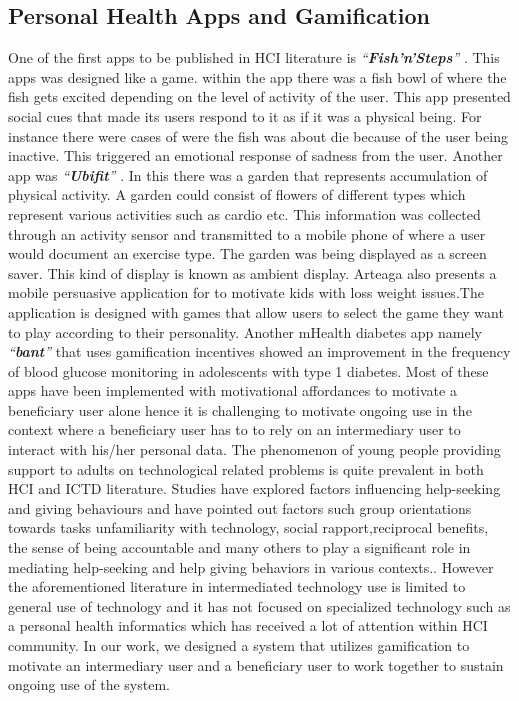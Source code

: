 \documentclass{sig-alternate}
\begin{document}
\subsection{Personal Health Apps and Gamification}  
One of the first apps to be published in HCI literature is \emph{``\textbf{Fish'n'Steps}''} \cite{lin2006:fish}. This apps was designed like a game. within the app there  was a fish bowl of where the fish gets excited depending on the level of activity of the user. This app presented social cues that made its users respond to it as if it was a physical being. For instance there were cases of were the fish was about die because of the user being inactive. This triggered an emotional response of sadness from the user.\newline
Another app was \emph{``\textbf{Ubifit}''} \cite{klasnja2009:using}. In this there was a garden that represents accumulation of physical activity. A garden could consist of flowers of different types which represent various activities such as cardio etc. This information was collected through an activity sensor and transmitted to a mobile phone of where a user would document an exercise type. The garden was being displayed as a screen saver. This kind of display is known as ambient display.\newline
Arteaga \cite{arteaga2010:persuasive} also presents a mobile persuasive application for to motivate kids with loss weight issues.The application is designed with games that allow users to select the game they want to play according to their personality. Another mHealth diabetes app namely \emph{``\textbf{bant}''} that uses gamification incentives showed an improvement in the frequency of blood glucose monitoring in adolescents with type 1 diabetes.\newline
Most of these apps have been implemented with motivational affordances to motivate a beneficiary user alone hence it is challenging to motivate ongoing use in the context where a beneficiary user has to to rely on an intermediary user to interact with his/her personal data. The phenomenon of young people providing support to adults on technological related problems is quite prevalent in both HCI and ICTD literature. Studies have explored factors influencing help-seeking and giving behaviours and have pointed out factors such group orientations towards tasks unfamiliarity with technology, social rapport,reciprocal benefits, the sense of being accountable and many others to play a significant role in mediating help-seeking and help giving behaviors in various contexts.\cite{sambasivan2010,poole:chh,kiesler:twi,parikh2006}. However the aforementioned literature in intermediated technology use is limited to general use of technology and it has not focused on specialized technology such as a personal health informatics which has received a lot of attention within HCI community. In our work, we designed a system that  utilizes gamification to motivate an intermediary user and a beneficiary user to work together to sustain ongoing use of the system.\newline 
\end{document}
